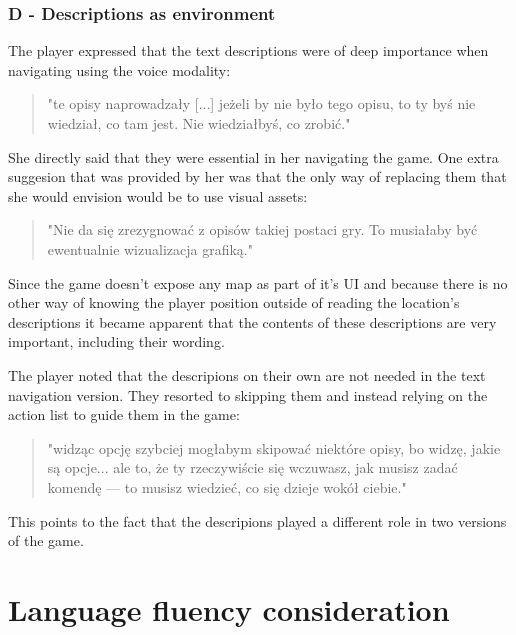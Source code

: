 \subsubsection{D - Descriptions as environment}


The player expressed that the text descriptions were of deep importance when navigating using the voice modality:
\begin{quote}
    "te opisy naprowadzały [...] jeżeli by nie było tego opisu, to ty byś nie wiedział, co tam jest. Nie wiedziałbyś, co zrobić."
\end{quote}

She directly said that they were essential in her navigating the game. One extra suggesion that was provided by her was that the only way of replacing them that she would envision would be to use visual assets:
\begin{quote}
    "Nie da się zrezygnować z opisów takiej postaci gry. To musiałaby być ewentualnie wizualizacja grafiką."
\end{quote}

Since the game doesn't expose any map as part of it's UI and because there is no other way of knowing the player position outside of reading the location's descriptions it became apparent that the contents of these descriptions are very important, including their wording. 


The player noted that the descripions on their own are not needed in the text navigation version. They resorted to skipping them and instead relying on the action list to guide them in the game:

\begin{quote}
    "widząc opcję szybciej mogłabym skipować niektóre opisy, bo widzę, jakie są opcje... ale to, że ty rzeczywiście się wczuwasz, jak musisz zadać komendę — to musisz wiedzieć, co się dzieje wokół ciebie."
\end{quote}

This points to the fact that the descripions played a different role in two versions of the game.


\section{Language fluency consideration}

